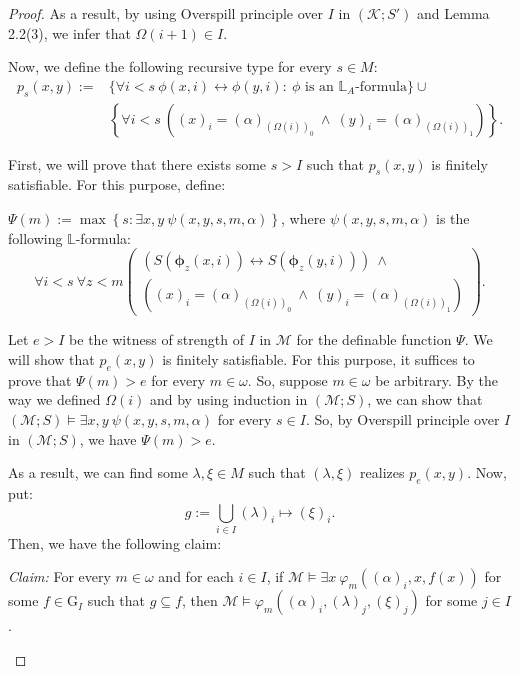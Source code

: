 \documentclass[10pt,a4paper]{amsart}
\newcommand{\G}{\mathrm{G}}
\newcommand{\K}{\mathcal{K}}
\newcommand{\M}{\mathcal{M}}
\begin{document}
\begin{proof}
As a result, by using  Overspill principle over $ I$ in $(\K;S')$ and Lemma 2.2(3), we infer that $\Omega(i+1)\in I$.	
	
	
		Now, we define the following recursive type for every $s\in M$:
	\begin{align*}
		p_{s}(x,y):=&\{\forall i<s \ \phi(x,i)\leftrightarrow\phi(y,i): \ \phi \text{ is an } \mathbb{L}_{A}\text{-formula}\}\cup\\&
	\left\lbrace	
		\forall i<s \ 
	 ((x)_{i}=(\alpha)_{(\Omega(i))_{0}} \ \wedge\ (y)_{i}=(\alpha)_{(\Omega(i))_{1}}) 
	\right\rbrace.
\end{align*}	
	
	
	First, we will prove that there exists some  $s>I$ such that  $p_{s}(x,y)$ is finitely satisfiable. For this purpose, define:
	\begin{center}
		$\Psi(m):= \max\left\lbrace s: \exists x,y \ 	\psi(x,y,s,m,\alpha) \right\rbrace$, where $\psi(x,y,s,m,\alpha) $ is the following $\mathbb{L}$-formula:
		$$\forall i<s \ \forall z<m \left(\begin{array}{c}
			(S(\bm{\phi}_{z}(x,i))\leftrightarrow S(\bm{\phi}_{z}(y,i))) \ \wedge\\
				 ((x)_{i}=(\alpha)_{(\Omega(i))_{0}} \ \wedge\ (y)_{i}=(\alpha)_{(\Omega(i))_{1}}) 
		\end{array}\right)  .$$
	\end{center}
	
	Let $e>I$ be the witness of strength of $I$ in $\M$ for the definable function $\Psi$. We will  show that $p_{e}(x,y)$ is finitely satisfiable. For this purpose, it suffices to prove that $\Psi(m)>e$ for every $m\in\omega$. So, suppose $m\in\omega$ be arbitrary. By the way we defined $\Omega(i)$ and by using induction in $(\M;S)$, we can show  that ${(\M;S)\models\exists x,y \ \psi(x,y,s,m,\alpha)}$ for every $s\in I$. So, by Overspill principle over $I$ in $(\M;S)$, we have $\Psi(m)>e$.
	
	As a result,  we can find some $ \lambda,\xi\in M $ such that $(\lambda,\xi)$ realizes $p_{e}(x,y)$. Now, put:
	$$ g:=\bigcup_{i\in I}(\lambda)_{i}\mapsto(\xi)_{i} .$$ 
	Then, we have the following claim:
	\begin{center}
		\textit{Claim:} For every $m\in\omega$ and for each $i\in I$, if  $\M\models\exists x \ \varphi_{m}((\alpha)_{i},x,f(x))$ for some $f\in\G_{I}$ such that $g\subseteq f$, then $\M\models\varphi_{m}((\alpha)_{i},(\lambda)_{j},(\xi)_{j})$ for some $j\in I$.
	\end{center}
	

\end{proof}
\end{document}
